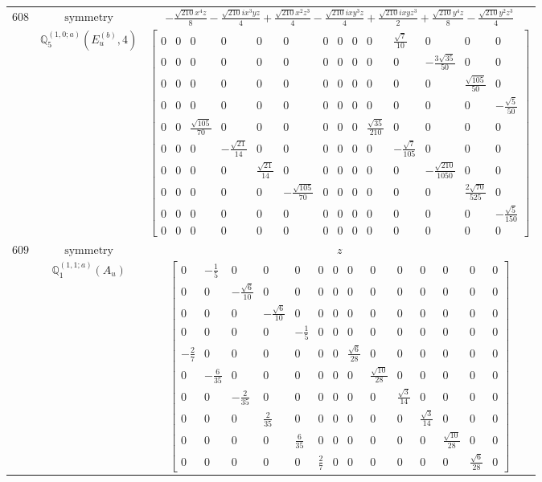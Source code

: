 \documentclass[fleqn,8pt,landscape]{jsarticle}
\begin{document}
\begin{longtable}{ccc}
$ 608 $ & $ \text{symmetry} $ & $ - \frac{\sqrt{210} x^{4} z}{8} - \frac{\sqrt{210} i x^{3} y z}{4} + \frac{\sqrt{210} x^{2} z^{3}}{4} - \frac{\sqrt{210} i x y^{3} z}{4} + \frac{\sqrt{210} i x y z^{3}}{2} + \frac{\sqrt{210} y^{4} z}{8} - \frac{\sqrt{210} y^{2} z^{3}}{4} $ \\
$  $ & $ \mathbb{Q}_{5}^{(1,0;a)}(E_{u}^{(b)},4) $ & $ \begin{bmatrix} 0 & 0 & 0 & 0 & 0 & 0 & 0 & 0 & 0 & 0 & \frac{\sqrt{7}}{10} & 0 & 0 & 0 \\ 0 & 0 & 0 & 0 & 0 & 0 & 0 & 0 & 0 & 0 & 0 & - \frac{3 \sqrt{35}}{50} & 0 & 0 \\ 0 & 0 & 0 & 0 & 0 & 0 & 0 & 0 & 0 & 0 & 0 & 0 & \frac{\sqrt{105}}{50} & 0 \\ 0 & 0 & 0 & 0 & 0 & 0 & 0 & 0 & 0 & 0 & 0 & 0 & 0 & - \frac{\sqrt{5}}{50} \\ 0 & 0 & \frac{\sqrt{105}}{70} & 0 & 0 & 0 & 0 & 0 & 0 & \frac{\sqrt{35}}{210} & 0 & 0 & 0 & 0 \\ 0 & 0 & 0 & - \frac{\sqrt{21}}{14} & 0 & 0 & 0 & 0 & 0 & 0 & - \frac{\sqrt{7}}{105} & 0 & 0 & 0 \\ 0 & 0 & 0 & 0 & \frac{\sqrt{21}}{14} & 0 & 0 & 0 & 0 & 0 & 0 & - \frac{\sqrt{210}}{1050} & 0 & 0 \\ 0 & 0 & 0 & 0 & 0 & - \frac{\sqrt{105}}{70} & 0 & 0 & 0 & 0 & 0 & 0 & \frac{2 \sqrt{70}}{525} & 0 \\ 0 & 0 & 0 & 0 & 0 & 0 & 0 & 0 & 0 & 0 & 0 & 0 & 0 & - \frac{\sqrt{5}}{150} \\ 0 & 0 & 0 & 0 & 0 & 0 & 0 & 0 & 0 & 0 & 0 & 0 & 0 & 0 \end{bmatrix} $ \\ \hline
$ 609 $ & $ \text{symmetry} $ & $ z $ \\
$  $ & $ \mathbb{Q}_{1}^{(1,1;a)}(A_{u}) $ & $ \begin{bmatrix} 0 & - \frac{1}{5} & 0 & 0 & 0 & 0 & 0 & 0 & 0 & 0 & 0 & 0 & 0 & 0 \\ 0 & 0 & - \frac{\sqrt{6}}{10} & 0 & 0 & 0 & 0 & 0 & 0 & 0 & 0 & 0 & 0 & 0 \\ 0 & 0 & 0 & - \frac{\sqrt{6}}{10} & 0 & 0 & 0 & 0 & 0 & 0 & 0 & 0 & 0 & 0 \\ 0 & 0 & 0 & 0 & - \frac{1}{5} & 0 & 0 & 0 & 0 & 0 & 0 & 0 & 0 & 0 \\ - \frac{2}{7} & 0 & 0 & 0 & 0 & 0 & 0 & \frac{\sqrt{6}}{28} & 0 & 0 & 0 & 0 & 0 & 0 \\ 0 & - \frac{6}{35} & 0 & 0 & 0 & 0 & 0 & 0 & \frac{\sqrt{10}}{28} & 0 & 0 & 0 & 0 & 0 \\ 0 & 0 & - \frac{2}{35} & 0 & 0 & 0 & 0 & 0 & 0 & \frac{\sqrt{3}}{14} & 0 & 0 & 0 & 0 \\ 0 & 0 & 0 & \frac{2}{35} & 0 & 0 & 0 & 0 & 0 & 0 & \frac{\sqrt{3}}{14} & 0 & 0 & 0 \\ 0 & 0 & 0 & 0 & \frac{6}{35} & 0 & 0 & 0 & 0 & 0 & 0 & \frac{\sqrt{10}}{28} & 0 & 0 \\ 0 & 0 & 0 & 0 & 0 & \frac{2}{7} & 0 & 0 & 0 & 0 & 0 & 0 & \frac{\sqrt{6}}{28} & 0 \end{bmatrix} $ \\ \hline

\end{longtable}
\end{document}
